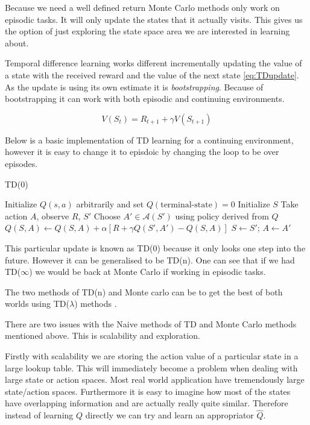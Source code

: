 Because we need a well defined return Monte Carlo methods only work on episodic tasks. It will only update the states that it actually visits. This gives us the option of just exploring the state space area we are interested in learning about.

Temporal difference learning works different incrementally updating the value of a state with the received reward and the value of the next state \ref{eq:TDupdate}. As the update is using its own estimate it is \textit{bootstrapping}. Because of bootstrapping it can work with both episodic and continuing environments.

\begin{equation}
V(S_{t})=R_{t+1}+\gamma V(S_{t+1})
\label{eq:TDupdate}
\end{equation}

Below is a basic implementation of TD learning for a continuing environment, however it is easy to change it to episdoic by changing the loop to be over episodes.

\begin{algorithm}
\caption{TD(0)}
\begin{algorithmic}[1]
\State Initialize $Q(s,a)$ arbitrarily and set $Q(\text{terminal-state}) = 0$
\State Initialize $S$
    \State Take action $A$, observe $R$, $S'$
    \State Choose $A' \in \mathcal{A}(S')$ using policy derived from $Q$
    \State $Q(S,A) \gets Q(S,A) + \alpha \left[ R + \gamma Q(S', A') - Q(S,A) \right]$
    \State $S \gets S'$; $A \gets A'$
\EndWhile
\end{algorithmic}
\end{algorithm}

This particular update is known as TD(0) because it only looks one step into the future. However it can be generalised to be TD(n). One can see that if we had TD($\infty$) we would be back at Monte Carlo if working in episodic tasks.

The two methods of TD(n) and Monte carlo can be to get the best of both worlds using TD($\lambda$) methods \cite{suttonLearningPredictMethods1988}.

There are two issues with the Naive methods of TD and Monte Carlo methods mentioned above. This is scalability and exploration.

Firstly with scalability we are storing the action value of a particular state in a large lookup table. This will immediately become a problem when dealing with large state or action spaces. Most real world application have tremendously large state/action spaces. Furthermore it is easy to imagine how most of the states have overlapping information and are actually really quite similar. Therefore instead of learning $Q$ directly we can try and learn an appropriator $\hat{Q}$.

